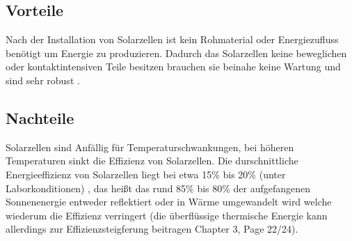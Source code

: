 \subsection{Vorteile}
    Nach der Installation von Solarzellen ist kein Rohmaterial oder
    Energiezufluss benötigt um Energie zu produzieren. Dadurch das
    Solarzellen keine beweglichen oder kontaktintensiven Teile besitzen
    brauchen sie beinahe keine Wartung und sind sehr robust
    \cite{SolarMaintenance}.

\subsection{Nachteile}
    Solarzellen sind Anfällig für Temperaturschwankungen, bei höheren
    Temperaturen sinkt die Effizienz von Solarzellen. Die durschnittliche
    Energieeffizienz von Solarzellen liegt bei etwa 15\% bis 20\% (unter
    Laborkonditionen) \cite{SolarEfficiency}, das heißt das rund 85\% bis 80\%
    der aufgefangenen Sonnenenergie entweder reflektiert oder in Wärme
    umgewandelt wird welche wiederum die Effizienz verringert (die überflüssige
    thermische Energie kann allerdings zur Effizienzsteigferung beitragen
    \cite{PhotovoltaicPrinciples} Chapter 3, Page 22/24).
